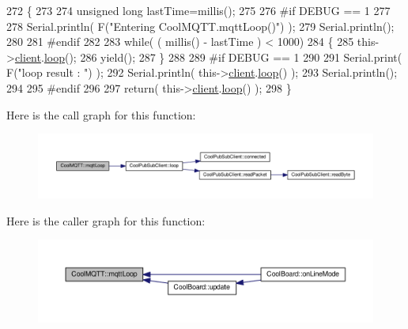 \begin{DoxyCode}
272 \{
273 
274     \textcolor{keywordtype}{unsigned} \textcolor{keywordtype}{long} lastTime=millis();
275 
276 \textcolor{preprocessor}{#if DEBUG == 1}
277 
278     Serial.println( F(\textcolor{stringliteral}{"Entering CoolMQTT.mqttLoop()"}) );
279     Serial.println();
280 
281 \textcolor{preprocessor}{#endif  }
282 
283     \textcolor{keywordflow}{while}( ( millis() - lastTime ) < 1000)
284     \{
285         this->\hyperlink{class_cool_m_q_t_t_afed1372683c44893b4668d0f1771f514}{client}.\hyperlink{class_cool_pub_sub_client_afc15900f0fc4886a19394508e61793b8}{loop}();
286         yield();
287     \}
288 
289 \textcolor{preprocessor}{#if DEBUG == 1 }
290     
291     Serial.print( F(\textcolor{stringliteral}{"loop result : "}) );
292     Serial.println( this->\hyperlink{class_cool_m_q_t_t_afed1372683c44893b4668d0f1771f514}{client}.\hyperlink{class_cool_pub_sub_client_afc15900f0fc4886a19394508e61793b8}{loop}() );
293     Serial.println();
294 
295 \textcolor{preprocessor}{#endif}
296 
297     \textcolor{keywordflow}{return}( this->\hyperlink{class_cool_m_q_t_t_afed1372683c44893b4668d0f1771f514}{client}.\hyperlink{class_cool_pub_sub_client_afc15900f0fc4886a19394508e61793b8}{loop}() );
298 \}
\end{DoxyCode}
Here is the call graph for this function\+:\nopagebreak
\begin{figure}[H]
\begin{center}
\leavevmode
\includegraphics[width=350pt]{d0/dd0/class_cool_m_q_t_t_aa5eaae967b562b62cbcf2b8d81f6e5d5_cgraph}
\end{center}
\end{figure}
Here is the caller graph for this function\+:\nopagebreak
\begin{figure}[H]
\begin{center}
\leavevmode
\includegraphics[width=350pt]{d0/dd0/class_cool_m_q_t_t_aa5eaae967b562b62cbcf2b8d81f6e5d5_icgraph}
\end{center}
\end{figure}
\mbox{\label{class_cool_m_q_t_t_a40553a0ad4b5ecf1cb4411ab54ca85fb}} 
